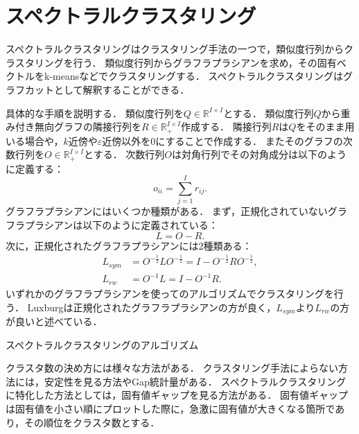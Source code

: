 \section{スペクトラルクラスタリング}
スペクトラルクラスタリングはクラスタリング手法の一つで，類似度行列からクラスタリングを行う．
類似度行列からグラフラプラシアンを求め，その固有ベクトルをk-meansなどでクラスタリングする．
スペクトラルクラスタリングはグラフカットとして解釈することができる．

具体的な手順を説明する．
類似度行列を$Q \in \mathbb{R}^{I \times I}$とする．
類似度行列$Q$から重み付き無向グラフの隣接行列を$R \in \mathbb{R}_+^{I \times I}$作成する．
隣接行列$R$は$Q$をそのまま用いる場合や，$k$近傍や$\varepsilon$近傍以外を0にすることで作成する．
またそのグラフの次数行列を$O \in \mathbb{R}_+^{I \times I}$とする．
次数行列$O$は対角行列でその対角成分は以下のように定義する：
\begin{equation}
	o_{ii} = \sum_{j=1}^I r_{ij}.
\end{equation}
グラフラプラシアンにはいくつか種類がある．
まず，正規化されていないグラフラプラシアンは以下のように定義されている：
\begin{equation}
	L = O - R.
\end{equation}
次に，正規化されたグラフラプラシアンには2種類ある：
\begin{align}
	L_{sym} &= O^{-\frac{1}{2}}LO^{-\frac{1}{2}} = I - O^{-\frac{1}{2}}RO^{-\frac{1}{2}}, \\
	L_{rw} &= O^{-1} L = I - O^{-1}R.
\end{align}
いずれかのグラフラプラシアンを使ってのアルゴリズムでクラスタリングを行う．
Luxburgは正規化されたグラフラプラシアンの方が良く，$L_{sym}$より$L_{rw}$の方が良いと述べている\cite{VonLuxburg}．

\begin{algorithm}
	\caption{スペクトラルクラスタリングのアルゴリズム}
	\label{al:spectral}
	\begin{algorithmic}[1]
	\end{algorithmic}
\end{algorithm}

クラスタ数の決め方には様々な方法がある．
クラスタリング手法によらない方法には，安定性を見る方法\cite{Ben-Hur}やGap統計量\cite{Tibshirani}がある．
スペクトラルクラスタリングに特化した方法としては，固有値ギャップを見る方法\cite{VonLuxburg}がある．
固有値ギャップは固有値を小さい順にプロットした際に，急激に固有値が大きくなる箇所であり，その順位をクラスタ数とする．

